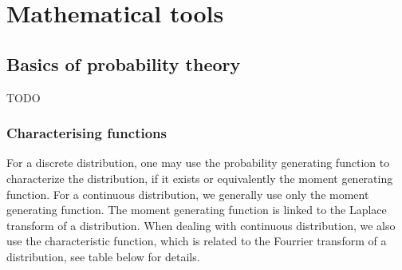 % 	
%
%
%

\chapter{Mathematical tools}
\section{Basics of probability theory}
TODO

\subsection{Characterising functions}
For a discrete distribution, one may use the probability generating function to characterize the distribution, if it exists or equivalently the moment generating function. For a continuous distribution, we generally use only the moment generating function. The moment generating function is linked to the Laplace transform of a distribution. When dealing with continuous distribution, we also use the characteristic function, which is related to the Fourrier transform of a distribution, see table below for details. 

